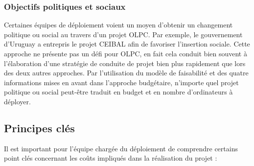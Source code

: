 \documentclass[11pt]{article}
\begin{document}
\subsubsection{Objectifs politiques et sociaux}
\label{sec-6-1-3}


Certaines équipes de déploiement voient un moyen d'obtenir un changement
politique ou social au travers d'un projet OLPC. Par exemple, le
gouvernement d'Uruguay a entrepris le projet CEIBAL afin de favoriser
l'insertion sociale. Cette approche ne présente pas un défi pour OLPC, en
fait cela conduit bien souvent à l'élaboration d'une stratégie de conduite
de projet bien plus rapidement que lors des deux autres approches. Par
l'utilisation du modèle de faisabilité et des quatre informations mises en
avant dans l'approche budgétaire, n'importe quel projet politique ou social
peut-être traduit en budget et en nombre d'ordinateurs à déployer.
\subsection{Principes clés}
\label{sec-6-2}


Il est important pour l'équipe chargée du déploiement de comprendre
certains point clés concernant les coûts impliqués dans la réalisation du
projet :
\end{document}
